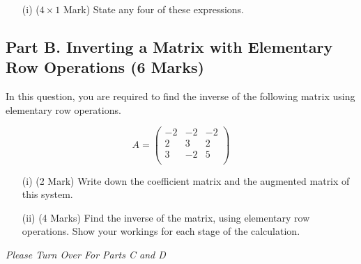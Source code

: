 \documentclass[a4paper,12pt]{article}
\begin{document}
	\begin{itemize}
		\item[(i)] ($4 \times 1$ Mark)
		State any four of these expressions.
	\end{itemize}
	
	\subsection*{Part B. Inverting a Matrix with Elementary Row Operations  (6 Marks)}	
In this question, you are required to find the inverse of the following matrix using elementary row operations.
	
	\begin{equation*}
	A=\left( \begin{array}{rrr}
-2  &  -2  &  -2\\
2  &  3  &  2\\
3  & -2  &  5\\
	\end{array} \right)
	\end{equation*}
	
	
			\begin{itemize}
				\item[(i)] (2 Mark) Write down the coefficient matrix and the augmented matrix of this system. %
				
				
				\item[(ii)] (4 Marks) Find the inverse of the matrix, using elementary row operations. Show your workings for each stage of the calculation.
			\end{itemize}
			\medskip
		\noindent 	\textit{Please Turn Over For Parts C and D}
\newpage
\end{document}
